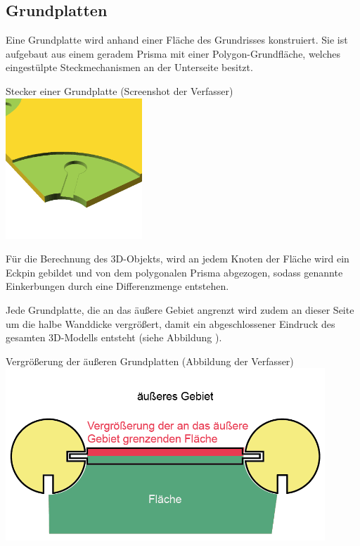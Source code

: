 \subsection{Grundplatten}
Eine Grundplatte wird anhand einer Fläche des Grundrisses konstruiert.
Sie ist aufgebaut aus einem geradem Prisma mit einer Polygon-Grundfläche, welches eingestülpte Steckmechanismen an der Unterseite besitzt.

\begin{Bild}{Stecker einer Grundplatte (Screenshot der Verfasser)}
	\includegraphics[height=200px]{Bilder/Untereinheit_GP}
\end{Bild}

Für die Berechnung des 3D-Objekts, wird an jedem Knoten der Fläche wird ein Eckpin gebildet und von dem polygonalen Prisma abgezogen, sodass genannte Einkerbungen durch eine Differenzmenge entstehen. 

Jede Grundplatte, die an das äußere Gebiet angrenzt wird zudem an dieser Seite um die halbe Wanddicke vergrößert, damit ein abgeschlossener Eindruck des gesamten 3D-Modells entsteht (siehe Abbildung \thebildnrnext).

\begin{Bild}{Vergrößerung der äußeren Grundplatten (Abbildung der Verfasser)}
	\includegraphics[width=120mm]{Bilder/GrundplatteVergroesserung-08}
\end{Bild}

